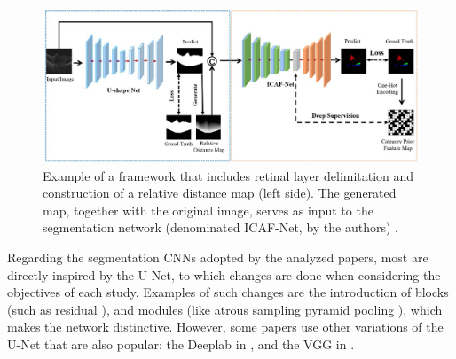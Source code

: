 \begin{figure}[!ht]
	\centering
	\includegraphics[width=1\linewidth]{figures/PreSegmentationAndFluidSegmentation.png}
	\caption{Example of a framework that includes retinal layer delimitation and construction of a relative distance map (left side). The generated map, together with the original image, serves as input to the segmentation network (denominated ICAF-Net, by the authors) \parencite{Tang2022}.}
	\label{fig:PreSegmentationAndFluidSegmentation}
\end{figure}
\par
Regarding the segmentation CNNs adopted by the analyzed papers, most are directly inspired by the U-Net, to which changes are done when considering the objectives of each study. Examples of such changes are the introduction of blocks (such as residual \parencite{Mantel2021, Zhang2023, Liu2024, Hassan2021b, Hassan2021a, Padilla2022}), and modules (like atrous sampling pyramid pooling \parencite{Hassan2021b, Hassan2021a, Hu2019, Sappa2021}), which makes the network distinctive. However, some papers use other variations of the U-Net that are also popular: the Deeplab \parencite{LChen2018} in \textcite{Hassan2021a, Li2023}, and the VGG \parencite{Simonyan2014} in \textcite{Padilla2022, Hassan2021b}.

